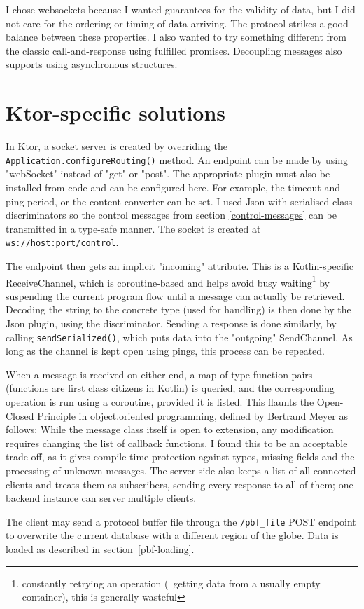 I chose websockets because I wanted guarantees for the validity of data, but I did not care for the ordering or timing of data arriving. The protocol strikes a good balance between these properties. I also wanted to try something different from the classic call-and-response using fulfilled promises. Decoupling messages also supports using asynchronous structures.

\section{Ktor-specific solutions}

In Ktor, a socket server is created by overriding the \verb|Application.configureRouting()| method. An endpoint can be made by using "webSocket" instead of "get" or "post". The appropriate plugin must also be installed from code and can be configured here. For example, the timeout and ping period, or the content converter can be set. I used Json with serialised class discriminators so the control messages from section \ref{control-messages} can be transmitted in a type-safe manner. The socket is created at \verb|ws://host:port/control|.

The endpoint then gets an implicit "incoming" attribute. This is a Kotlin-specific ReceiveChannel, which is coroutine-based and helps avoid busy waiting\footnote{constantly retrying an operation (\eg~getting data from a usually empty container), this is generally wasteful} by suspending the current program flow until a message can actually be retrieved. Decoding the string to the concrete type (used for handling) is then done by the Json plugin, using the discriminator. Sending a response is done similarly, by calling \verb|sendSerialized()|, which puts data into the "outgoing" SendChannel. As long as the channel is kept open using pings, this process can be repeated.

When a message is received on either end, a map of type-function pairs (functions are first class citizens in Kotlin) is queried, and the corresponding operation is run using a coroutine, provided it is listed. This flaunts the Open-Closed Principle in object.oriented programming, defined by Bertrand Meyer\cite{OOSC-OCP} as follows:  While the message class itself is open to extension, any modification requires changing the list of callback functions. I found this to be an acceptable trade-off, as it gives compile time protection against typos, missing fields and the processing of unknown messages. The server side also keeps a list of all connected clients and treats them as subscribers, sending every response to all of them; one backend instance can server multiple clients.

\label{file-upload}
The client may send a protocol buffer file through the \verb|/pbf_file| POST endpoint to overwrite the current database with a different region of the globe. Data is loaded as described in section~\ref{pbf-loading}.